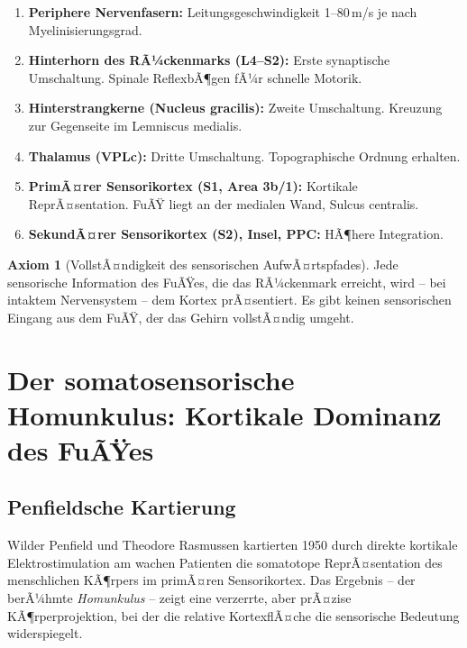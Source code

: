 ﻿\documentclass[12pt,a4paper]{report}
\theoremstyle{plain}
\theoremstyle{definition}
\newtheorem{axiom}[theorem]{Axiom}
\theoremstyle{remark}
\begin{document}
\begin{enumerate}
\item \textbf{Periphere Nervenfasern:} Leitungsgeschwindigkeit 1--80\,m/s
  je nach Myelinisierungsgrad.
\item \textbf{Hinterhorn des RÃ¼ckenmarks (L4--S2):} Erste synaptische
  Umschaltung. Spinale ReflexbÃ¶gen fÃ¼r schnelle Motorik.
\item \textbf{Hinterstrangkerne (Nucleus gracilis):} Zweite Umschaltung.
  Kreuzung zur Gegenseite im Lemniscus medialis.
\item \textbf{Thalamus (VPLc):} Dritte Umschaltung.
  Topographische Ordnung erhalten.
\item \textbf{PrimÃ¤rer Sensorikortex (S1, Area 3b/1):} Kortikale ReprÃ¤sentation.
  FuÃŸ liegt an der medialen Wand, Sulcus centralis.
\item \textbf{SekundÃ¤rer Sensorikortex (S2), Insel, PPC:} HÃ¶here Integration.
\end{enumerate}

\begin{axiom}[VollstÃ¤ndigkeit des sensorischen AufwÃ¤rtspfades]
Jede sensorische Information des FuÃŸes, die das RÃ¼ckenmark erreicht, wird
-- bei intaktem Nervensystem -- dem Kortex prÃ¤sentiert. Es gibt keinen
sensorischen Eingang aus dem FuÃŸ, der das Gehirn vollstÃ¤ndig umgeht.
\end{axiom}

\chapter{Der somatosensorische Homunkulus: Kortikale Dominanz des FuÃŸes}

\section{Penfieldsche Kartierung}

Wilder Penfield und Theodore Rasmussen kartierten 1950 durch direkte
kortikale Elektrostimulation am wachen Patienten die somatotope ReprÃ¤sentation
des menschlichen KÃ¶rpers im primÃ¤ren Sensorikortex. Das Ergebnis -- der
berÃ¼hmte \emph{Homunkulus} -- zeigt eine verzerrte, aber prÃ¤zise
KÃ¶rperprojektion, bei der die relative KortexflÃ¤che die sensorische
Bedeutung widerspiegelt.
\end{document}
